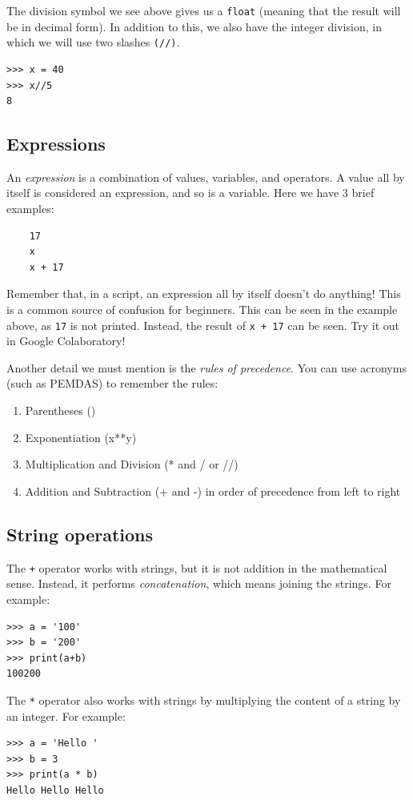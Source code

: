 The division symbol we see above gives us a \texttt{float} (meaning that the result will be in decimal form). In addition to this, we also have the integer division, in which we will use two slashes \texttt{(//)}.
\begin{verbatim}
>>> x = 40
>>> x//5
8
\end{verbatim}

\subsection{Expressions}
An \textit{expression} is a combination of values, variables, and operators. A value all by itself is considered an expression, and so is a variable. Here we have 3 brief examples:
\begin{verbatim}
    17
    x
    x + 17
\end{verbatim}

Remember that, in a script, an expression all by itself doesn’t do anything! This is a common
source of confusion for beginners. This can be seen in the example above, as \texttt{17} is not printed. Instead, the result of \texttt{x + 17} can be seen. Try it out in Google Colaboratory!

Another detail we must mention is the \textit{rules of precedence}. You can use acronyms (such as PEMDAS) to remember the rules:
\begin{enumerate}
    \item Parentheses ()
    \item Exponentiation (x**y)
    \item Multiplication and Division (* and / or //)
    \item Addition and Subtraction (+ and -) in order of precedence from left to right
\end{enumerate}

\subsection{String operations}
The \texttt{+} operator works with strings, but it is not addition in the mathematical sense. Instead, it performs \textit{concatenation}, which means joining the strings. For example:
\begin{verbatim}
>>> a = '100'
>>> b = '200'
>>> print(a+b)
100200
\end{verbatim}

The \texttt{*} operator also works with strings by multiplying the content of a string by an integer. For example:
\begin{verbatim}
>>> a = 'Hello '
>>> b = 3
>>> print(a * b)
Hello Hello Hello
\end{verbatim}

